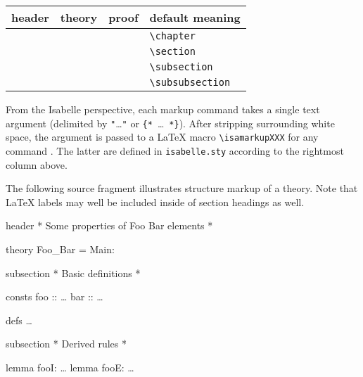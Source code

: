 \begin{isabellebody}
\begin{isamarkuptext}
  \begin{tabular}{llll}
  header & theory & proof & default meaning \\\hline
    & \commdx{chapter} & & \verb,\chapter, \\
  \commdx{header} & \commdx{section} & \commdx{sect} & \verb,\section, \\
    & \commdx{subsection} & \commdx{subsect} & \verb,\subsection, \\
    & \commdx{subsubsection} & \commdx{subsubsect} & \verb,\subsubsection, \\
  \end{tabular}

  \medskip

  From the Isabelle perspective, each markup command takes a single
  text argument (delimited by \verb,",\dots\verb,", or
  \verb,{,\verb,*,~\dots~\verb,*,\verb,},).  After stripping
  surrounding white space, the argument is passed to a {\LaTeX} macro
  \verb,\isamarkupXXX, for any command .  The latter
  are defined in \verb,isabelle.sty, according to the rightmost column
  above.

  \medskip The following source fragment illustrates structure markup
  of a theory.  Note that {\LaTeX} labels may well be included inside
  of section headings as well.

  \begin{ttbox}
  header {\ttlbrace}* Some properties of Foo Bar elements *{\ttrbrace}

  theory Foo_Bar = Main:

  subsection {\ttlbrace}* Basic definitions *{\ttrbrace}

  consts
    foo :: \dots
    bar :: \dots

  defs \dots

  subsection {\ttlbrace}* Derived rules *{\ttrbrace}

  lemma fooI: \dots
  lemma fooE: \dots


\end{ttbox}
\end{isamarkuptext}
\end{isabellebody}
